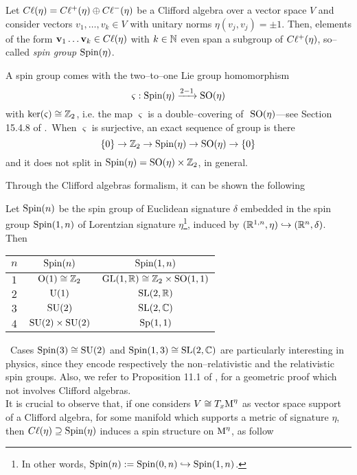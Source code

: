 {\begin{defi}
Let $C\ell(\eta)=C\ell^+(\eta)\oplus C\ell^-(\eta)$ be a Clifford algebra over a vector space $V$ and consider vectors $v_1,\hdots,v_k\in V$ with unitary norms $\eta(v_j,v_j)=\pm1$. Then, elements of the form $\mathbf{v}_1\hdots\mathbf{v}_k\in C\ell(\eta)$ with $k\in\mathbb{N}$ even span a subgroup of $C\ell^+(\eta)$, so--called \emph{spin group} $\text{\normalfont Spin}(\eta)$.
\end{defi}
A spin group comes with the two--to--one Lie group homomorphism
    $$\varsigma:\text{\normalfont Spin}(\eta)\xrightarrow{2-1}\text{\normalfont SO}(\eta)$$
    with $\ker(\varsigma)\cong\mathbb{Z}_2$, i.e. the map $\varsigma$ is a double--covering of $\,\,\text{\normalfont SO}(\eta)$---see Section 15.4.8 of \cite{fatib}.\, When $\varsigma$ is surjective, an exact sequence of group is there
    $$\{0\}\to\mathbb{Z}_2\to\text{\normalfont Spin}(\eta)\to\text{\normalfont SO}(\eta)\to\{0\}$$
    and it does not split in $\text{\normalfont Spin}(\eta)=\text{\normalfont SO}(\eta)\times\mathbb{Z}_2$, in general.
    
    Through the Clifford algebras formalism, it can be shown the following}
\begin{prop}\label{sl2C}
Let $\text{\normalfont Spin}(n)$ be the spin group of Euclidean signature $\delta$ embedded in the spin group $\text{\normalfont Spin}(1,n)$ of Lorentzian signature $\eta$\footnote{In other words, $\text{\normalfont Spin}(n):=\text{\normalfont Spin}(0,n)\hookrightarrow\text{\normalfont Spin}(1,n)$.}, induced by $(\mathbb{R}^{1,n},\eta)\hookrightarrow(\mathbb{R}^n,\delta)$.\, Then
    \begin{center}
    \begin{tabular}{c|c|c}
        $n$ & $\text{\normalfont Spin}(n)$&$\text{\normalfont Spin}(1,n)$\\
        \hline
        $1$ & $\text{\normalfont O}(1)\cong\mathbb{Z}_2$ &$\text{\normalfont GL}(1,\mathbb{R})\cong\mathbb{Z}_2\times\text{\normalfont SO}(1,1)$\\
        $2$ & $\text{\normalfont U}(1)$ &$\text{\normalfont SL}(2,\mathbb{R})$\\
        $3$ & $\text{\normalfont SU}(2)$ &$\text{\normalfont SL}(2,\mathbb{C})$\\
        $4$ & $\text{\normalfont SU}(2)\times\text{\normalfont SU}(2)$ &$\text{\normalfont Sp}(1,1)$\\
    \end{tabular}
\end{center}
\end{prop}
\,\newline
Cases $\text{\normalfont Spin}(3)\cong\text{\normalfont SU}(2)$ and $\text{\normalfont Spin}(1,3)\cong\text{\normalfont SL}(2,\mathbb{C})$ are particularly interesting in physics, since they encode respectively the non--relativistic and the relativistic spin groups. Also, we refer to Proposition 11.1 of \cite{spinor}, for a geometric proof which not involves Clifford algebras. \\

{It is crucial to observe that, if one considers $V\cong T_x\text{\normalfont M}^\eta$ as vector space support of a Clifford algebra, for some manifold which supports a metric of signature $\eta$, then $C\ell(\eta)\supseteq\text{\normalfont Spin}(\eta)$ induces a spin structure on $\text{\normalfont M}^\eta$, as follow}

